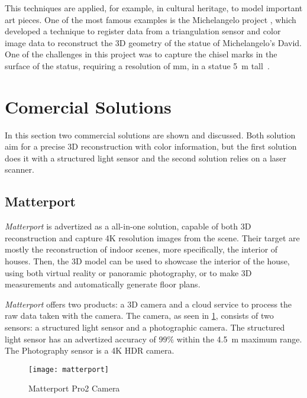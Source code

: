 This techniques are applied, for example, in cultural heritage, to model important art pieces. One of the most famous examples is the Michelangelo project \cite{levoy2000}, which developed a technique to register data from a triangulation sensor and color image data to reconstruct the 3D geometry of the statue of Michelangelo's David. One of the challenges in this project was to capture the chisel marks in the surface of the status, requiring a resolution of  \si{\milli\meter}, in a statue \SI{5}{\meter} tall~\cite{levoy2000}.

\section{Comercial Solutions}

In this section two commercial solutions are shown and discussed. Both solution aim for a precise 3D reconstruction with color information, but the first solution does it with a structured light sensor and the second solution relies on a laser scanner. 

\subsection{Matterport}

\emph{Matterport} is advertized as a all-in-one solution, capable of both 3D reconstruction and capture 4K resolution images from the scene. Their target are mostly the reconstruction of indoor scenes, more specifically, the interior of houses. Then, the 3D model can be used to showcase the interior of the house, using both virtual reality or panoramic photography, or to make 3D measurements and automatically generate floor plans\cite{matterport}.

\emph{Matterport} offers two products: a 3D camera and a cloud service to process the raw data taken with the camera. The camera, as seen in \cref{fig:matterport-camera}, consists of two sensors: a structured light sensor and a photographic camera\cite{matterport}. The structured light sensor has an advertized accuracy of $99\%$ within the \SI{4.5}{\meter} maximum range. The Photography sensor is a 4K HDR camera.

\begin{figure}[h]
    
    \centering
    \texttt{[image: matterport]}

    \caption{Matterport Pro2 Camera}
    \label{fig:matterport-camera}

\end{figure}

